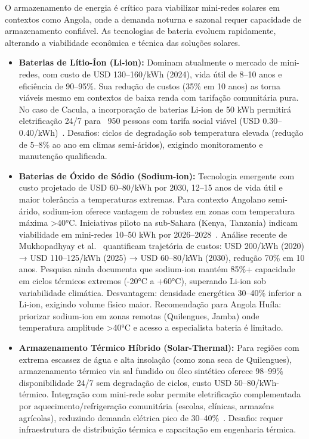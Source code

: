 \documentclass[12pt, a4paper]{article}
\begin{document}
O armazenamento de energia é crítico para viabilizar mini-redes solares em contextos como Angola, onde a demanda noturna e sazonal requer capacidade de armazenamento confiável. As tecnologias de bateria evoluem rapidamente, alterando a viabilidade econômica e técnica das soluções solares.

\begin{itemize}
  \item \textbf{Baterias de Lítio-Íon (Li-ion):} Dominam atualmente o mercado de mini-redes, com custo de USD 130--160/kWh (2024), vida útil de 8--10 anos e eficiência de 90--95\%. Sua redução de custos (35\% em 10 anos) as torna viáveis mesmo em contextos de baixa renda com tarifação comunitária pura. No caso de Cacula, a incorporação de baterias Li-ion de 50 kWh permitirá eletrificação 24/7 para ~950 pessoas com tarifa social viável (USD 0.30--0.40/kWh)~\citep{Kizilcec2020}. Desafios: ciclos de degradação sob temperatura elevada (redução de 5--8\% ao ano em climas semi-áridos), exigindo monitoramento e manutenção qualificada.

  \item \textbf{Baterias de Óxido de Sódio (Sodium-ion):} Tecnologia emergente com custo projetado de USD 60--80/kWh por 2030, 12--15 anos de vida útil e maior tolerância a temperaturas extremas. Para contexto Angolano semi-árido, sodium-ion oferece vantagem de robustez em zonas com temperatura máxima >40°C. Iniciativas piloto na sub-Sahara (Kenya, Tanzania) indicam viabilidade em mini-redes 10--50 kWh por 2026--2028~\citep{Zaraket2022}. Análise recente de Mukhopadhyay et al.~\citep{Mukhopadhyay2025} quantificam trajetória de custos: USD 200/kWh (2020) → USD 110--125/kWh (2025) → USD 60--80/kWh (2030), redução 70\% em 10 anos. Pesquisa ainda documenta que sodium-ion mantém 85\%+ capacidade em ciclos térmicos extremos (-20°C a +60°C), superando Li-ion sob variabilidade climática. Desvantagem: densidade energética 30--40\% inferior a Li-ion, exigindo volume físico maior. Recomendação para Angola Huíla: priorizar sodium-ion em zonas remotas (Quilengues, Jamba) onde temperatura amplitude >40°C e acesso a especialista bateria é limitado.

  \item \textbf{Armazenamento Térmico Híbrido (Solar-Thermal):} Para regiões com extrema escassez de água e alta insolação (como zona seca de Quilengues), armazenamento térmico via sal fundido ou óleo sintético oferece 98--99\% disponibilidade 24/7 sem degradação de ciclos, custo USD 50--80/kWh-térmico. Integração com mini-rede solar permite eletrificação complementada por aquecimento/refrigeração comunitária (escolas, clínicas, armazéns agrícolas), reduzindo demanda elétrica pico de 30--40\%~\citep{Zaraket2022}. Desafio: requer infraestrutura de distribuição térmica e capacitação em engenharia térmica.
\end{itemize}
\end{document}
